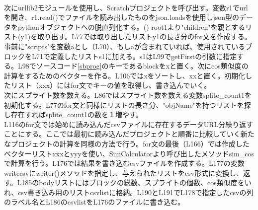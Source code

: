 \documentclass[a4paper,10pt,onecolumn,oneside,openany]{jsbook}
\begin{document}
\\
次にurllib2モジュールを使用し、Scratchプロジェクトを呼び出す。変数r1でurlを開き、r1.read()でファイルを読み出したものをjson.loadsを使用しjson型のデータをpythonオブジェクトへの脱直列化する。(\cite{loads})  root1より"children"を親とするリスト(y1)を取り出す。L77では取り出したリストy1の長さ分のfor文を作成する。事前に"scripts"を変数aとし（L70）、もしaが含まれていれば、使用されているブロックをL71で定義したリストs1に加える。s1はL99でgetFirstの引数に指定する。L98でソースコード\ref{sbprog}のキーであるblockをxと置く。次にcos類似度の計算をするためのベクターを作る。L106ではxをソートし、xxと置く。初期化したリスト（xxx）にはfor文でキーの値を取得し、書き込んでいく。
\\
次にスプライト数を数える。L86ではスプライト数を数える変数splite\_count1を初期化する。L77のfor文と同様にリストの長さ分、"objName"を持つリストを探し存在すればsplite\_count1の数を１増やす。
\\
L116のfor文では始めに読み込んだcsvファイルに存在するデータURL分繰り返すことにする。ここでは最初に読み込んだプロジェクトと順番に比較していく新たなプロジェクトの計算を同様の方法で行う。for文の最後（L166）では作成したベクターリストxxxとyyyを使い、SimCalculatorより呼び出したメソッドsim\_cosで計算を行う。L176では結果を書き込むcsvファイルを作成する。L177の変数writecsvにwriter()メソッドを指定し、与えられたリストをcsv形式に変換し、返す。L185のbodyリストにはブロックの総数、スプライトの個数、cos類似度をいれ、csv書き込み用のリストcsvlistに格納。L190とL191でL178で指定したcsvの列のラベル名とL186のcsvlistをL176のファイルに書き込む。
\end{document}

